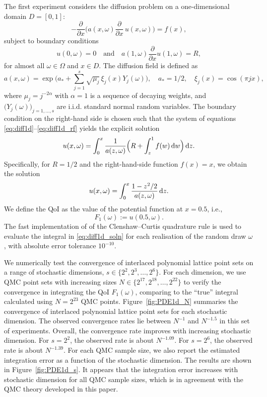 \documentclass[namedate,webpdf,imanum]{ima-authoring-arxiv}%
\theoremstyle{thmstyletwo}%
\numberwithin{equation}{section}
\newcommand{\rd}{\, {\rm d}}
\begin{document}
The first experiment considers the diffusion problem on a one-dimensional domain $D = [0,1]$:
\begin{equation}\label{eq:diff1d}
- \frac{\partial}{\partial x} \Big( a(x, \omega) \frac{\partial}{\partial x} \, u(x, \omega)\Big) = f(x), 
\end{equation}
subject to boundary conditions
\begin{equation}\label{eq:diff1d_bc}
u(0, \omega) =0 \quad \text{and} \quad a(1, \omega) \frac{\partial}{\partial x} u(1, \omega) = R,
\end{equation}
for almost all $\omega \in \Omega$ and $x \in D$. The diffusion field is defined as 
\begin{equation}\label{eq:diff1d_rf}
a(x, \omega) = \exp\Big(a_\ast + \sum_{j = 1}^s \sqrt{\mu_j} \, \xi_j(x) Y_j(\omega)\Big), \quad a_\ast = 1/2, \quad \xi_j(x) = \cos(\pi j x),
\end{equation}
where $\mu_j = j^{-2\alpha}$ with $\alpha =1$ is a sequence of decaying weights, and $\big(Y_j(\omega)\big)_{j = 1, \ldots, s}$ are i.i.d. standard normal random variables. The boundary condition on the right-hand side is chosen such that the system of equations \eqref{eq:diff1d}--\eqref{eq:diff1d_rf} yields the explicit solution~\citep{MS13}
\[
u(x, \omega) = \int_0^x \frac{1}{a(z,\omega)} \Big(R + \int_z^1 f (w) \rd w\Big) \rd z.
\]
Specifically, for $R=1/2$ and the right-hand-side function $f(x) = x$, we obtain the solution 
\begin{equation}\label{eq:diff1d_soln}
u(x, \omega) = \int_0^x \frac{1 - z^2/2}{a(z,\omega)} \rd z.
\end{equation}
We define the QoI as the value of the potential function at $x = 0.5$, i.e.,  \[
F_1(\omega):=u(0.5, \omega).\] The fast implementation of \cite{Waldvogel} of the Clenshaw--Curtis quadrature rule \citep{CC60} is used to evaluate the integral in \eqref{eq:diff1d_soln} for each realisation of the random draw $\omega$, with absolute error tolerance $10^{-10}$. 

We numerically test the convergence of interlaced polynomial lattice point sets on a range of stochastic dimensions, $s \in \{2^2, 2^3, \ldots, 2^6 \}$. For each dimension, we use QMC point sets with increasing sizes $N \in \{2^{17}, 2^{18}, \ldots, 2^{22}\}$ to verify the convergence in integrating the QoI $F_1(\omega)$, comparing to the ``true'' integral calculated using $N = 2^{23}$ QMC points. Figure~\ref{fig:PDE1d_N} summaries the convergence of interlaced polynomial lattice point sets for each stochastic dimension. The observed convergence rates lie between $N^{-1}$ and $N^{-1.5}$ in this set of experiments. Overall, the convergence rate improves with increasing stochastic dimension. For $s=2^2$, the observed rate is about $N^{-1.09}$. For $s=2^{6}$, the observed rate is about $N^{-1.39}$. For each QMC sample size, we also report the estimated integration error as a function of the stochastic dimension. The results are shown in Figure~\ref{fig:PDE1d_s}. It appears that the integration error increases with stochastic dimension for all QMC sample sizes, which is in agreement with the QMC theory developed in this paper. 
\end{document}
